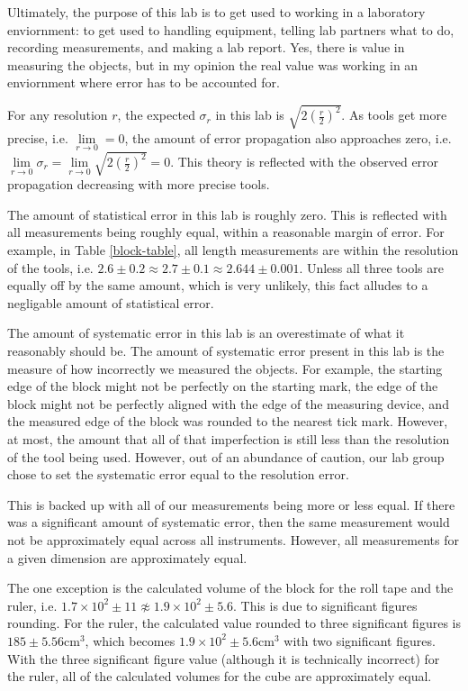 \documentclass[12pt]{article}
\begin{document}
Ultimately, the purpose of this lab is to get used to working in a laboratory enviornment: to get used to handling equipment, telling lab partners what to do, recording measurements, and making a lab report. Yes, there is value in measuring the objects, but in my opinion the real value was working in an enviornment where error has to be accounted for.

For any resolution \(r\), the expected \(\sigma_{r}\) in this lab is \(\sqrt{2(\frac{r}{2})^{2}}\). As tools get more precise, i.e. \(\lim\limits_{r \to 0}=0\), the amount of error propagation also approaches zero, i.e. \(\lim\limits_{r \to 0} \sigma_{r} = \lim\limits_{r \to 0} \sqrt{2(\frac{r}{2})^{2}}=0\). This theory is reflected with the observed error propagation decreasing with more precise tools.

The amount of statistical error in this lab is roughly zero. This is reflected with all measurements being roughly equal, within a reasonable margin of error. For example, in Table \ref{block-table}, all length measurements are within the resolution of the tools, i.e. \(2.6\pm0.2 \approx 2.7\pm0.1 \approx 2.644\pm0.001\). Unless all three tools are equally off by the same amount, which is very unlikely, this fact alludes to a negligable amount of statistical error.

The amount of systematic error in this lab is an overestimate of what it reasonably should be. The amount of systematic error present in this lab is the measure of how incorrectly we measured the objects. For example, the starting edge of the block might not be perfectly on the starting mark, the edge of the block might not be perfectly aligned with the edge of the measuring device, and the measured edge of the block was rounded to the nearest tick mark. However, at most, the amount that all of that imperfection is still less than the resolution of the tool being used. However, out of an abundance of caution, our lab group chose to set the systematic error equal to the resolution error.

This is backed up with all of our measurements being more or less equal. If there was a significant amount of systematic error, then the same measurement would not be approximately equal across all instruments. However, all measurements for a given dimension are approximately equal.

The one exception is the calculated volume of the block for the roll tape and the ruler, i.e. \(1.7\times10^{2}\pm11 \not\approx 1.9\times10^{2}\pm5.6\). This is due to significant figures rounding. For the ruler, the calculated value rounded to three significant figures is \(185\pm5.56\)cm\(^{3}\), which becomes \(1.9\times10^{2}\pm5.6\)cm\(^{3}\) with two significant figures. With the three significant figure value (although it is technically incorrect) for the ruler, all of the calculated volumes for the cube are approximately equal.
\end{document}
